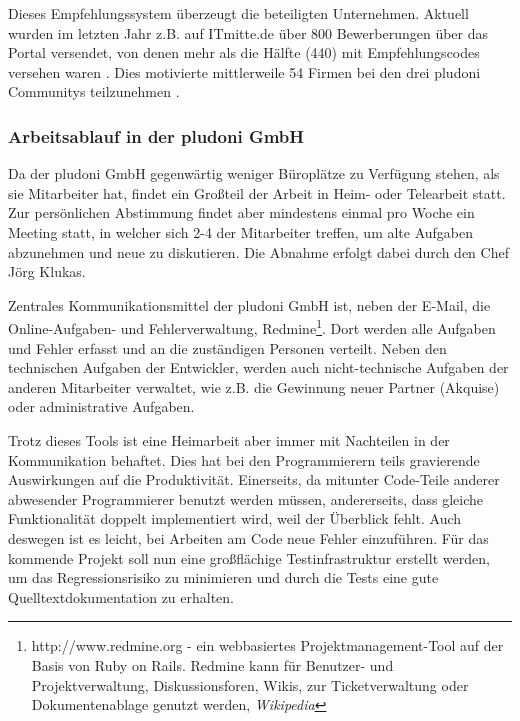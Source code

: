 Dieses Empfehlungssystem überzeugt die beteiligten Unternehmen. Aktuell wurden im letzten Jahr z.B. auf ITmitte.de über 800 Bewerberungen über das Portal versendet, von denen mehr als die Hälfte (440) mit Empfehlungscodes versehen waren \citep{joerg_klukas_startseite_2011}. Dies motivierte mittlerweile 54 Firmen bei den drei pludoni Communitys teilzunehmen \citep{joerg_klukas_referenzen_2011}.

\subsubsection{Arbeitsablauf in der pludoni GmbH}

Da der pludoni GmbH gegenwärtig weniger Büroplätze zu Verfügung stehen, als sie Mitarbeiter hat, findet ein Großteil der Arbeit in Heim- oder Telearbeit statt.
Zur persönlichen Abstimmung findet aber mindestens einmal pro Woche ein Meeting statt, in welcher sich 2-4 der Mitarbeiter treffen, um alte Aufgaben abzunehmen und neue zu diskutieren. Die Abnahme erfolgt dabei durch den Chef Jörg Klukas.

Zentrales Kommunikationsmittel der pludoni GmbH ist, neben der E-Mail, die Online-Aufgaben- und Fehlerverwaltung, Redmine\footnote{http://www.redmine.org - ein webbasiertes Projektmanagement-Tool auf der Basis von Ruby on Rails. Redmine kann für Benutzer- und Projektverwaltung, Diskussionsforen, Wikis, zur Ticketverwaltung oder Dokumentenablage genutzt werden, \textit{Wikipedia}}. Dort werden alle Aufgaben und Fehler erfasst und an die zuständigen Personen verteilt. 
Neben den technischen Aufgaben der Entwickler, werden auch nicht-technische Aufgaben der anderen Mitarbeiter verwaltet, wie z.B. die Gewinnung neuer Partner (Akquise) oder administrative Aufgaben. 

Trotz dieses Tools ist eine Heimarbeit aber immer mit Nachteilen in der Kommunikation behaftet. Dies hat bei den Programmierern teils gravierende Auswirkungen auf die Produktivität. Einerseits, da mitunter Code-Teile anderer abwesender Programmierer benutzt werden müssen,  andererseits, dass gleiche Funktionalität doppelt implementiert wird, weil der Überblick fehlt. Auch deswegen ist es leicht, bei Arbeiten am Code neue Fehler einzuführen. 
Für das kommende Projekt soll nun eine großflächige Testinfrastruktur erstellt werden, um das Regressionsrisiko zu minimieren und durch die Tests eine gute Quelltextdokumentation zu erhalten.
